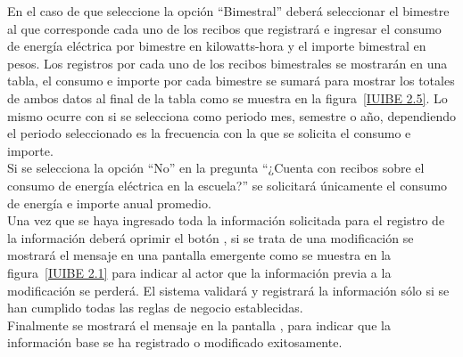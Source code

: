     En el caso de que seleccione la opción ``Bimestral'' deberá seleccionar el bimestre al que corresponde cada uno de los recibos que registrará e ingresar el consumo de energía eléctrica por bimestre en kilowatts-hora y el importe bimestral en pesos. Los registros por cada uno de los recibos bimestrales se mostrarán en una tabla, el consumo e importe por cada bimestre se sumará para mostrar los totales de ambos datos al final de la tabla como se muestra en la figura~\ref{IUIBE 2.5}. Lo mismo ocurre con si se selecciona como periodo mes, semestre o año, dependiendo el periodo seleccionado es la frecuencia con la que se solicita el consumo e importe. \\
    
    Si se selecciona la opción ``No'' en la pregunta ``¿Cuenta con recibos sobre el consumo de energía eléctrica en la escuela?'' se solicitará únicamente el consumo de energía e importe anual promedio.\\  
    
    Una vez que se haya ingresado toda la información solicitada para el registro de la información deberá oprimir el botón , si se trata de una modificación se mostrará el mensaje  en una pantalla emergente como se muestra en la figura~\ref{IUIBE 2.1} para indicar al actor que la información previa a la modificación se perderá. El sistema validará y registrará la información sólo si se han cumplido todas las reglas de negocio establecidas.\\
    
    Finalmente se mostrará el mensaje  en la pantalla , para indicar que la información base se ha registrado o modificado exitosamente.
      
  
